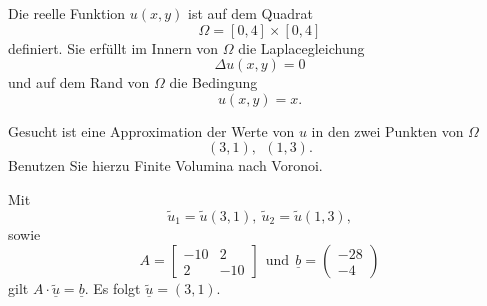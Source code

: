 Die reelle Funktion $u(x,y)$ ist auf dem Quadrat
\[
\Omega = [0, 4] \times [0,4]
\]
definiert.
Sie erfüllt im Innern von $\Omega$ die Laplacegleichung
\[
\Delta u(x,y) = 0
\]
und auf dem Rand von $\Omega$ die Bedingung
\[
u(x,y) = x.
\]

Gesucht ist eine Approximation der Werte von $u$ in den zwei Punkten von
$\Omega$
\[
(3,1), \ \    (1,3).
\]
Benutzen Sie hierzu Finite Volumina nach Voronoi.  

\begin{loesung}
Mit 
\[
\tilde u_1 = \tilde u(3,1), \ \tilde u_2 = \tilde u(1,3),
\]
sowie 
\[
A = \left[\begin{array}{rr} 
-10 & 2   \\
 2 & -10 \end{array}\right] \ \ \mbox{und} \ \
\underline{b} =  \left(\begin{array}{r} -28 \\ -4 \end{array}\right)
\]
gilt $A \cdot \underline{\tilde u} = \underline{b}.$
Es folgt $\underline{\tilde u} = (3, 1).$
\end{loesung}

